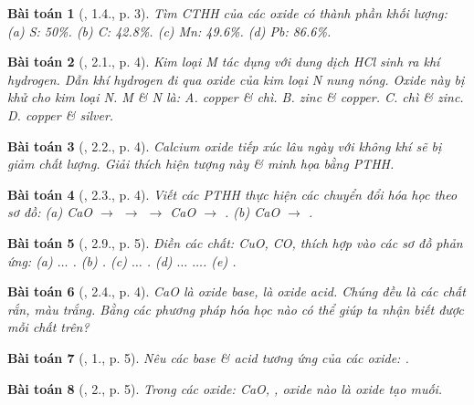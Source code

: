 \documentclass{article}
\newtheorem{baitoan}{Bài toán}
\begin{document}
\begin{baitoan}[\cite{SBT_Hoa_Hoc_9}, 1.4., p. 3]
	Tìm CTHH của các oxide có thành phần khối lượng: (a) \emph{S: 50\%}. (b) \emph{C: 42.8\%}. (c) \emph{Mn: 49.6\%}. (d) \emph{Pb: 86.6\%}.
\end{baitoan}

\begin{baitoan}[\cite{SBT_Hoa_Hoc_9}, 2.1., p. 4]
	Kim loại M tác dụng với dung dịch \emph{HCl} sinh ra khí hydrogen. Dẫn khí hydrogen đi qua oxide của kim loại N nung nóng. Oxide này bị khử cho kim loại N. M \& N là: {\sf A.} copper \& chì. {\sf B.} zinc \& copper. {\sf C.} chì \& zinc. {\sf D.} copper \& silver.
\end{baitoan}

\begin{baitoan}[\cite{SBT_Hoa_Hoc_9}, 2.2., p. 4]
	Calcium oxide tiếp xúc lâu ngày với không khí sẽ bị giảm chất lượng. Giải thích hiện tượng này \& minh họa bằng PTHH.
\end{baitoan}

\begin{baitoan}[\cite{SBT_Hoa_Hoc_9}, 2.3., p. 4]
	Viết các PTHH thực hiện các chuyển đổi hóa học theo sơ đồ: (a) \emph{CaO $\to$  $\to$  $\to$ CaO $\to$ }. (b) \emph{CaO $\to$ }.
\end{baitoan}

\begin{baitoan}[\cite{SBT_Hoa_Hoc_9}, 2.9., p. 5]
	Điền các chất: \emph{CuO, CO, } thích hợp vào các sơ đồ phản ứng: (a) $\ldots$ \emph{}. (b) \emph{}. (c) $\ldots$ \emph{}. (d) $\ldots$ \emph{ $\ldots$}. (e) \emph{}.
\end{baitoan}

\begin{baitoan}[\cite{SBT_Hoa_Hoc_9}, 2.4., p. 4]
	\emph{CaO} là oxide base, \emph{} là oxide acid. Chúng đều là các chất rắn, màu trắng. Bằng các phương pháp hóa học nào có thể giúp ta nhận biết được mỗi chất trên?
\end{baitoan}

\begin{baitoan}[\cite{An_350_BT_Hoa_Hoc_9}, 1., p. 5]
	Nêu các base \& acid tương ứng của các oxide: \emph{}.
\end{baitoan}

\begin{baitoan}[\cite{An_350_BT_Hoa_Hoc_9}, 2., p. 5]
	Trong các oxide: \emph{CaO, }, oxide nào là oxide tạo muối.
\end{baitoan}
\end{document}
